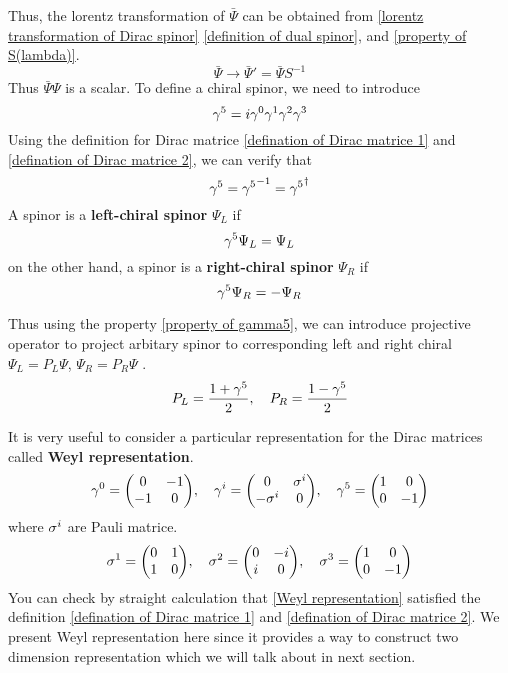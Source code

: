 Thus, the lorentz transformation of $\bar{\Psi}$ can be obtained from \eqref{lorentz transformation of Dirac spinor}  \eqref{definition of dual spinor}, and \eqref{property of S(lambda)}. 
\begin{equation}\label{lorentz transformation of barPsi}
\bar\Psi \rightarrow \bar{\Psi}' = \bar{\Psi}S^{-1}
\end{equation}
Thus $\bar{\Psi}\Psi$ is a scalar.
To define a chiral spinor, we need to introduce
\begin{equation}
\gamma^5 = i\gamma^0\gamma^1\gamma^2\gamma^3
\end{equation}
Using the definition for Dirac matrice \eqref{defination of Dirac matrice 1} and \eqref{defination of Dirac matrice 2}, we can verify that
\begin{equation}\label{property of gamma5}
\gamma^5 ={\gamma^5}^{-1} = {\gamma^5}^{\dagger}
\end{equation}
A spinor is a \textbf{left-chiral spinor} $\Psi_L$ if 
\begin{equation}\label{definition of left chiral spinor}
\gamma^5\Psi_L = \Psi_L
\end{equation}
on the other hand, a spinor is a \textbf{right-chiral spinor} $\Psi_R$ if 
\begin{equation}\label{definition of right chiral spinor}
\gamma^5 \Psi_R = -\Psi_R
\end{equation}


Thus using the property \eqref{property of gamma5}, we can introduce projective operator to project arbitary spinor to corresponding left and right chiral $\Psi_L = P_L\Psi$, $\Psi_R = P_R\Psi$ .
\begin{equation}
P_L = \frac{1+\gamma^5}{2} ,\quad P_R = \frac{1-\gamma^5}{2}
\end{equation}

It is very useful to consider a particular representation for the Dirac matrices called \textbf{Weyl representation}.
\begin{equation}\label{Weyl representation}
\g^0 = \mqty(  0 & -1\\
-1 &  0),\quad
\g^i = \mqty(  0 &  \s^{i}\\
-\s^{i}&   0   ),\quad
\g^5 = \mqty(  1 &  0\\
0 & -1)
\end{equation}
where $\sigma^i$ are Pauli matrice.
\begin{equation}\label{Pauli matrice}
\s^1 = \mqty( 0 & 1 \\
1 & 0),\quad
\s^2 = \mqty( 0 & -i \\ 
i & 0),\quad
\s^3 = \mqty( 1 & 0 \\
0 & -1)     
\end{equation} 
You can check by straight calculation that \eqref{Weyl representation} satisfied the definition \eqref{defination of Dirac matrice 1} and \eqref{defination of Dirac matrice 2}. We present Weyl representation here since it provides a way to construct two dimension representation which we will talk about in next section.

